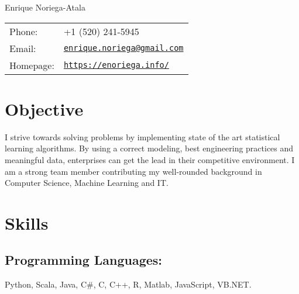\documentclass[letterpaper]{article}
\def\name{Enrique Noriega-Atala}
\renewenvironment{itemize}{
  \begin{list}{}{
    \setlength{\leftmargin}{1.5em}
  }
}{
  \end{list}
}
\begin{document}
{\huge \name}


\vspace{0.25in}

\begin{minipage}{0.45\linewidth}
  \begin{tabular}{ll}
    Phone: & +1 (520) 241-5945 \\
    Email: & \href{mailto:enrique.noriega@gmail.com}{\tt enrique.noriega@gmail.com} \\
    Homepage: & \href{https://enoriega.info/}{\tt https://enoriega.info/} \\
  \end{tabular}
\end{minipage}


%

\section*{Objective}
I strive towards solving problems by implementing state of the art statistical learning algorithms. By using a correct modeling, best engineering practices and meaningful data, enterprises can get the lead in their competitive environment. I am a strong team member contributing my well-rounded background in Computer Science, Machine Learning and IT.


\section*{Skills}
\subsection*{Programming Languages:}
\begin{itemize}
	\item Python, Scala, Java, C\#, C, C++, R, Matlab, JavaScript, VB.NET.
\end{itemize}
\vspace{-2em}
\end{document}
